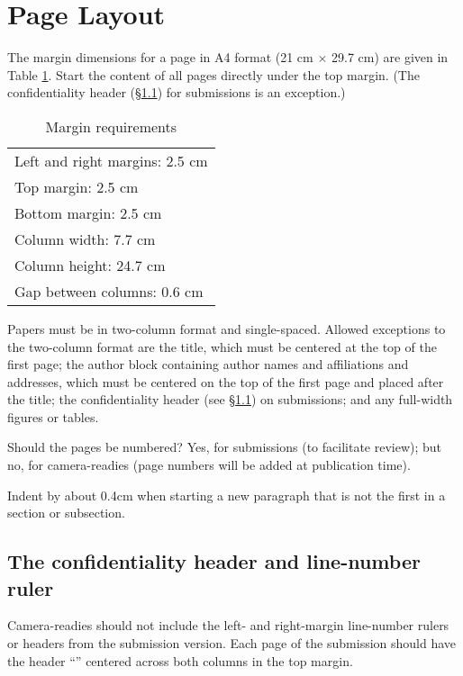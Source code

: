 \documentclass[11pt,a4paper]{article}
\begin{document}
\section{Page Layout}
\label{ssec:layout}


The margin dimensions for a page in A4 format (21 cm $\times$ 29.7 cm) are given
in Table \ref{tab:margin-table}.  Start the content of all pages directly under
the top margin.
\iftaclfinal
\else
(The confidentiality header (\S\ref{sec:ruler-and-header}) for submissions is an
exception.)
\fi


\begin{table}[ht]
\begin{center}
\begin{tabular}{|l|}  \hline
Left and right margins: 2.5 cm \\
Top margin: 2.5 cm \\
Bottom margin: 2.5 cm \\
Column width: 7.7 cm \\
Column height: 24.7 cm \\
Gap between columns: 0.6 cm \\ \hline
\end{tabular}
\end{center}
\caption{\label{tab:margin-table} Margin requirements}
\end{table}


Papers must be in two-column format and single-spaced.
Allowed exceptions to the two-column format are the title, which must be
centered at the top of the first page;
\iftaclfinal
the author block containing author names and affiliations and addresses, which
must be centered on the top of the first page and placed after the title;
\else
the  confidentiality header (see \S\ref{sec:ruler-and-header}) on submissions;
\fi
and any full-width figures or tables.

Should the pages be numbered?  Yes, for submissions (to facilitate review); but
no, for camera-readies (page numbers will be added at publication time).


{Indent} by about 0.4cm when starting a new paragraph that is not the first in a
section or subsection.

\subsection{The confidentiality header and line-number ruler}
\label{sec:ruler-and-header}
\iftaclfinal
Camera-readies should not include the left- and right-margin line-number rulers
or headers from the submission version.
\else
Each page of the submission should have the header ``\confidentialtext''
centered across both columns in the top margin.
\end{document}
